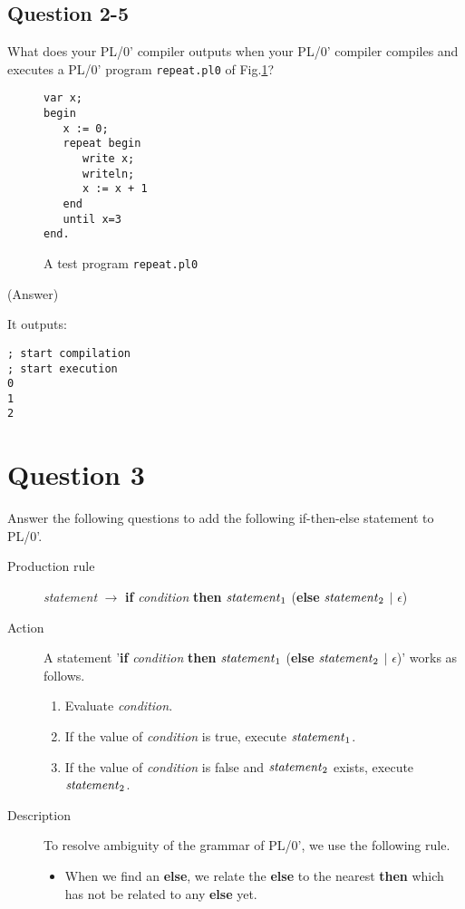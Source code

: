 \documentclass{article}
\begin{document}
\subsection*{Question 2-5}
What does your PL/0' compiler outputs when your PL/0' compiler compiles
and executes a PL/0' program {\tt repeat.pl0} of Fig.\ref{fig:repeat-until}?

\begin{figure}[h]
\begin{verbatim}
var x;
begin
   x := 0;
   repeat begin
      write x; 
      writeln;
      x := x + 1
   end
   until x=3
end.
\end{verbatim}
\caption{A test program {\tt repeat.pl0}}\label{fig:repeat-until}
\end{figure}


\ifreport
(Answer)\\
\fi

It outputs:
\begin{verbatim}
; start compilation
; start execution
0
1
2
\end{verbatim}



\newpage
\section*{Question 3}
Answer the following questions to add the following if-then-else statement to PL/0'.

\begin{description}
 \item[Production rule] {\it statement}  $\to$ {\bf if} {\it condition} {\bf then} 
       ${\it statement}_1$ ({\bf else} ${\it statement}_2$ $\vert$ {$\epsilon$})
 \item[Action] A statement '{\bf if} {\it condition} {\bf then} 
	    ${\it statement}_1$ ({\bf else} ${\it statement}_2$ $\vert$ {$\epsilon$})'
	    works as follows.
	    \begin{enumerate}
	     \item Evaluate {\it condition}.
	     \item If the value of {\it condition} is true, execute ${\it statement}_1$.
	     \item If the value of {\it condition} is false and ${\it statement}_2$ exists, 
		   execute ${\it statement}_2$.
	    \end{enumerate}
 \item[Description] To resolve ambiguity of the grammar of PL/0', 
	    we use the following rule.
	    \begin{itemize}
	     \item When we find an {\bf else}, we relate the {\bf else} to the nearest {\bf then}
		   which has not be related to any {\bf else} yet.
	    \end{itemize}
\end{description}
\end{document}
